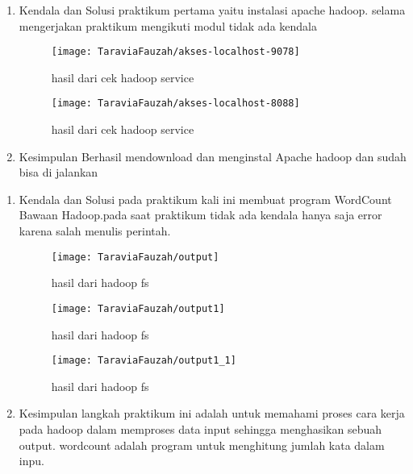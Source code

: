 
\begin{enumerate}
\item Kendala dan Solusi
\newline praktikum pertama yaitu instalasi apache hadoop. selama mengerjakan praktikum mengikuti modul tidak ada kendala

\begin{figure}[!ht]
\texttt{[image: TaraviaFauzah/akses-localhost-9078]}
\caption{hasil dari cek hadoop service}
\label{gam:perkuliahan15-9}
\end{figure}

\begin{figure}[!ht]
\texttt{[image: TaraviaFauzah/akses-localhost-8088]}
\caption{hasil dari cek hadoop service}
\label{gam:perkuliahan15-9}
\end{figure}

\item Kesimpulan
\newline Berhasil mendownload dan menginstal Apache hadoop dan sudah bisa di jalankan 
\end{enumerate}

\begin{enumerate}
\item Kendala dan Solusi
\newline pada praktikum kali ini membuat program WordCount Bawaan Hadoop.pada saat praktikum tidak ada kendala hanya saja error karena salah menulis perintah.

\begin{figure}[!ht]
\texttt{[image: TaraviaFauzah/output]}
\caption{hasil dari hadoop fs}
\label{gam:perkuliahan1-10}
\end{figure}

\begin{figure}[!ht]
\texttt{[image: TaraviaFauzah/output1]}
\caption{hasil dari hadoop fs}
\label{gam:perkuliahan1-10}
\end{figure}

\begin{figure}[!ht]
\texttt{[image: TaraviaFauzah/output1\_1]}
\caption{hasil dari hadoop fs}
\label{gam:perkuliahan1-10}
\end{figure}

\item Kesimpulan
\newline langkah praktikum ini adalah untuk memahami proses cara kerja pada hadoop dalam memproses data input sehingga menghasikan sebuah output. wordcount adalah program untuk menghitung jumlah kata dalam inpu.

\end{enumerate}

